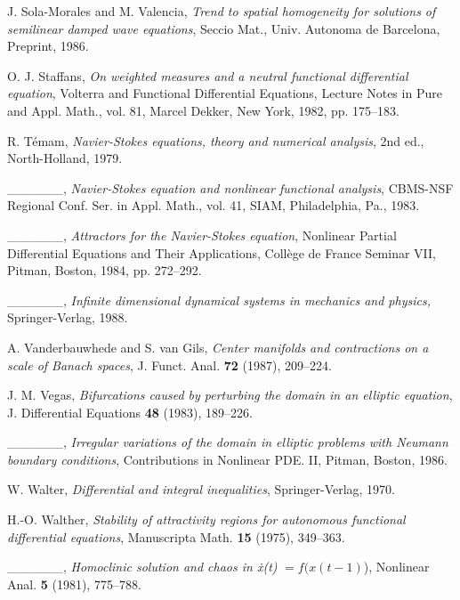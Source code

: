 \documentclass{surv-l}
\theoremstyle{plain}
\theoremstyle{definition}
\numberwithin{equation}{section}
\numberwithin{figure}{chapter}
\begin{document}
\begin{thebibliography}{}
J. Sola-Morales and M. Valencia, \emph{Trend to spatial homogeneity for solutions of semilinear damped wave equations}, Seccio Mat., Univ. Autonoma de Barcelona, Preprint, 1986.

 O. J. Staffans, \emph{On weighted measures and a neutral functional differential equation}, Volterra and Functional Differential Equations, Lecture Notes in Pure and Appl. Math., vol. 81, Marcel Dekker, New York, 1982, pp.
175--183.

R. T\'{e}mam, \emph{Navier-Stokes equations, theory and numerical analysis}, 2nd ed., North-Holland, 1979.

 \_\_\_\_\_\_, \emph{Navier-Stokes equation and nonlinear functional analysis}, CBMS-NSF
Regional Conf. Ser. in Appl. Math., vol. 41, SIAM, Philadelphia, Pa., 1983.

 \_\_\_\_\_\_, \emph{Attractors for the Navier-Stokes equation}, Nonlinear Partial Differential Equations and Their Applications, Coll\`{e}ge de France Seminar VII, Pitman, Boston, 1984, pp. 272--292.

 \_\_\_\_\_\_, \emph{Infinite dimensional dynamical systems in mechanics and physics,}
Springer-Verlag, 1988.

A. Vanderbauwhede and S. van Gils, \emph{Center manifolds and contractions on a scale of Banach spaces}, J. Funct. Anal. \textbf{72} (1987), 209--224.

J. M. Vegas, \emph{Bifurcations caused by perturbing the domain in an elliptic equation}, J. Differential Equations \textbf{48} (1983), 189--226.

 \_\_\_\_\_\_, \emph{Irregular variations of the domain in elliptic problems with Neumann boundary conditions}, Contributions in Nonlinear PDE. II, Pitman, Boston, 1986.

W. Walter, \emph{Differential and integral inequalities}, Springer-Verlag, 1970.

H.-O. Walther, \emph{Stability of attractivity regions for autonomous functional differential equations}, Manuscripta Math. \textbf{15} (1975), 349--363.

 \_\_\_\_\_\_, \emph{Homoclinic solution and chaos in \.{x}(t) }$=f(x(t- 1)$), Nonlinear Anal.
\textbf{5} (1981), 775--788.


\end{thebibliography}
\end{document}
